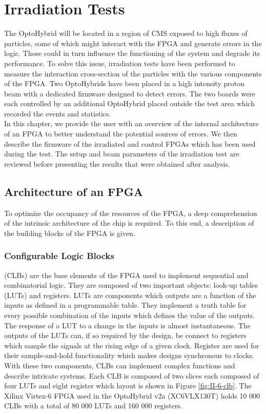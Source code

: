 \chapter{Irradiation Tests}
\label{chap:II-6-irradiation}

  The OptoHybrid will be located in a region of CMS exposed to high fluxes of particles, some of which might interact with the FPGA and generate errors in the logic. Those could in turn influence the functioning of the system and degrade its performance. To solve this issue, irradiation tests have been performed to measure the interaction cross-section of the particles with the various components of the FPGA. Two OptoHybrids have been placed in a high intensity proton beam with a dedicated firmware designed to detect errors. The two boards were each controlled by an additional OptoHybrid placed outside the test area which recorded the events and statistics. \\

  In this chapter, we provide the user with an overview of the internal architecture of an FPGA to better understand the potential sources of errors. We then describe the firmware of the irradiated and control FPGAs which has been used during the test. The setup and beam parameters of the irradiation test are reviewed before presenting the results that were obtained after analysis.

  \section{Architecture of an FPGA}

    To optimize the occupancy of the resources of the FPGA, a deep comprehension of the intrinsic architecture of the chip is required. To this end, a description of the building blocks of the FPGA is given.

    \subsection{Configurable Logic Blocks} (CLBs) \cite{VIRTEX-CLB} are the base elements of the FPGA used to implement sequential and combinatorial logic. They are composed of two important objects: look-up tables (LUTs) and registers. LUTs are components which outputs are a function of the inputs as defined in a programmable table. They implement a truth table for every possible combination of the inputs which defines the value of the outputs. The response of a LUT to a change in the inputs is almost instantaneous. The outputs of the LUTs can, if so required by the design, be connect to registers which sample the signals at the rising edge of a given clock. Register are used for their sample-and-hold functionality which makes designs synchronous to clocks. With these two components, CLBs can implement complex functions and describe intricate systems. Each CLB is composed of two slices each composed of four LUTs and eight register which layout is shown in Figure \ref{fig:II-6-clb}. The Xilinx Virtex-6 FPGA used in the OptoHybrid v2a (XC6VLX130T) holds 10 000 CLBs with a total of 80 000 LUTs and 160 000 registers.

